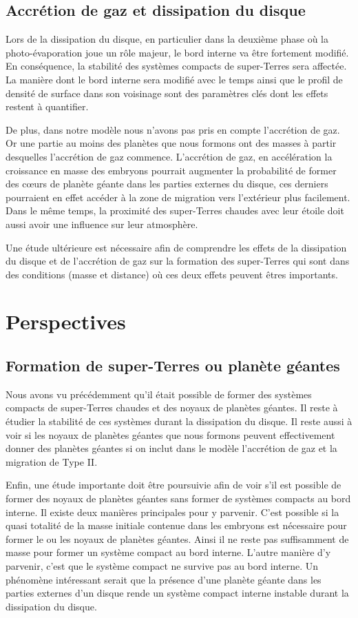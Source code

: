 \subsection{Accrétion de gaz et dissipation du disque}
Lors de la dissipation du disque, en particulier dans la deuxième phase où la photo-évaporation joue un rôle majeur, le bord interne va être fortement modifié. En conséquence, la stabilité des systèmes compacts de super-Terres sera affectée. La manière dont le bord interne sera modifié avec le temps ainsi que le profil de densité de surface dans son voisinage sont des paramètres clés dont les effets restent à quantifier. 

De plus, dans notre modèle nous n'avons pas pris en compte l'accrétion de gaz. Or une partie au moins des planètes que nous
formons ont des masses à partir desquelles l'accrétion de gaz commence. L'accrétion de gaz, en accélération la croissance en
masse des embryons pourrait augmenter la probabilité de former des cœurs de planète géante dans les parties externes du
disque, ces derniers pourraient en effet accéder à la zone de migration vers l'extérieur plus facilement. Dans le même temps, la
proximité des super-Terres chaudes avec leur étoile doit aussi avoir une influence sur leur atmosphère. 

Une étude ultérieure est nécessaire afin de comprendre les effets de la dissipation du disque et de l'accrétion de gaz sur la formation des super-Terres qui sont dans des conditions (masse et distance) où ces deux effets peuvent êtres importants.


\section{Perspectives}
\subsection{Formation de super-Terres ou planète géantes}
Nous avons vu précédemment qu'il était possible de former des systèmes compacts de super-Terres chaudes et des noyaux de planètes géantes. Il reste à étudier la stabilité de ces systèmes durant la dissipation du disque. Il reste aussi à voir si les noyaux de planètes géantes que nous formons peuvent effectivement donner des planètes géantes si on inclut dans le modèle l'accrétion de gaz et la migration de Type II. 

Enfin, une étude importante doit être poursuivie afin de voir s'il est possible de former des noyaux de planètes géantes sans former de systèmes compacts au bord interne. Il existe deux manières principales pour y parvenir. C'est possible si la quasi totalité de la masse initiale contenue dans les embryons est nécessaire pour former le ou les noyaux de planètes géantes. Ainsi il ne reste pas suffisamment de masse pour former un système compact au bord interne. L'autre manière d'y parvenir, c'est que le système compact ne survive pas au bord interne. Un phénomène intéressant serait que la présence d'une planète géante dans les parties externes d'un disque rende un système compact interne instable durant la dissipation du disque. 

